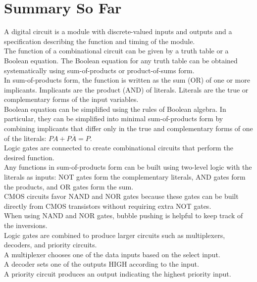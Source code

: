 \documentclass[12pt]{article}
\theoremstyle{definition}
\begin{document}
  \newpage
  \section{Summary So Far}
  A digital circuit is a module with discrete-valued inputs and outputs and a specification describing the function and timing of the module. \\

  The function of a combinational circuit can be given by a truth table or a Boolean equation. The Boolean equation for any truth table can be obtained systematically using sum-of-products or product-of-sums form. \\
  In sum-of-products form, the function is written as the sum (OR) of one or more implicants.
  Implicants are the product (AND) of literals.
  Literals are the true or complementary forms of the input variables.  \\

  Boolean equation can be simplified using the rules of Boolean algebra.
  In particular, they can be simplified into minimal sum-of-products form by combining implicants that differ only in the true and complementary forms of one of the literals: $PA + P\overline{A} = P$. \\

  Logic gates are connected to create combinational circuits that perform the desired function. \\
  Any functions in sum-of-products form can be built using two-level logic with the literals as inputs: NOT gates form the complementary literals, AND gates form the products, and OR gates form the sum. \\
  CMOS circuits favor NAND and NOR gates because these gates can be built directly from CMOS transistors without requiring extra NOT gates. \\
  When using NAND and NOR gates, bubble pushing is helpful to keep track of the inversions. \\

  Logic gates are combined to produce larger circuits such as multiplexers, decoders, and priority circuits. \\
  A multiplexer chooses one of the data inputs based on the select input. \\
  A decoder sets one of the outputs HIGH according to the input. \\
  A priority circuit produces an output indicating the highest priority input. \\
\end{document}
